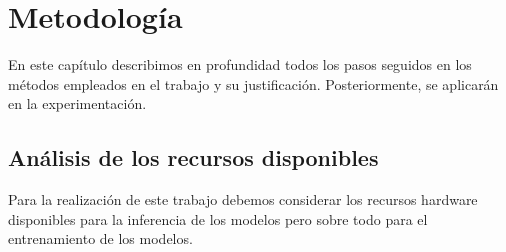 \chapter{Metodología}

En este capítulo describimos en profundidad todos los pasos seguidos en los métodos empleados en el trabajo y su justificación. Posteriormente, se aplicarán en la experimentación.

\section{Análisis de los recursos disponibles}

Para la realización de este trabajo debemos considerar los recursos hardware disponibles para la inferencia de los modelos pero sobre todo para el entrenamiento de los modelos.


